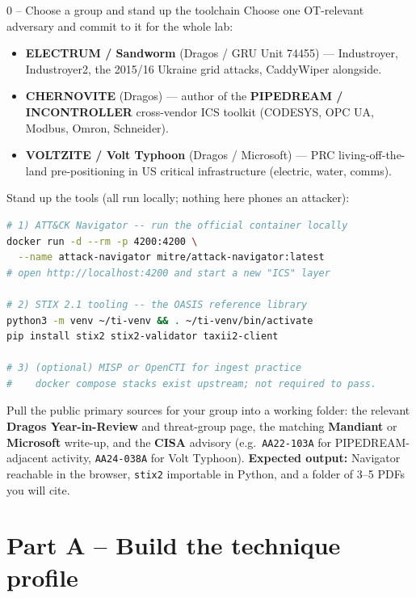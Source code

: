 \documentclass[11pt,a4paper]{article}
\begin{document}
\begin{stepbox}{0 -- Choose a group and stand up the toolchain}
Choose one OT-relevant adversary and commit to it for the whole lab:

\begin{itemize}\setlength{\itemsep}{1pt}
  \item \textbf{ELECTRUM / Sandworm} (Dragos / GRU Unit 74455) --- Industroyer,
        Industroyer2, the 2015/16 Ukraine grid attacks, CaddyWiper alongside.
  \item \textbf{CHERNOVITE} (Dragos) --- author of the \textbf{PIPEDREAM /
        INCONTROLLER} cross-vendor ICS toolkit (CODESYS, OPC UA, Modbus,
        Omron, Schneider).
  \item \textbf{VOLTZITE / Volt Typhoon} (Dragos / Microsoft) --- PRC
        living-off-the-land pre-positioning in US critical infrastructure
        (electric, water, comms).
\end{itemize}

Stand up the tools (all run locally; nothing here phones an attacker):
\begin{lstlisting}[language=bash]
# 1) ATT&CK Navigator -- run the official container locally
docker run -d --rm -p 4200:4200 \
  --name attack-navigator mitre/attack-navigator:latest
# open http://localhost:4200 and start a new "ICS" layer

# 2) STIX 2.1 tooling -- the OASIS reference library
python3 -m venv ~/ti-venv && . ~/ti-venv/bin/activate
pip install stix2 stix2-validator taxii2-client

# 3) (optional) MISP or OpenCTI for ingest practice
#    docker compose stacks exist upstream; not required to pass.
\end{lstlisting}

Pull the public primary sources for your group into a working folder:
the relevant \textbf{Dragos Year-in-Review} and threat-group page, the matching
\textbf{Mandiant} or \textbf{Microsoft} write-up, and the \textbf{CISA}
advisory (e.g.\ \texttt{AA22-103A} for PIPEDREAM-adjacent activity,
\texttt{AA24-038A} for Volt Typhoon). \textbf{Expected output:} Navigator
reachable in the browser, \texttt{stix2} importable in Python, and a folder of
3--5 PDFs you will cite.
\end{stepbox}

\section*{Part A -- Build the technique profile}
\end{document}

